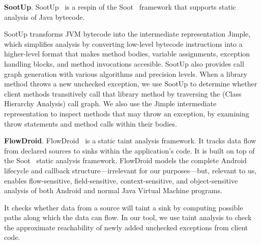 \textbf{SootUp}. SootUp~\cite{Karakaya24:_SootUp} is a respin of the Soot~\cite{vallee2010soot} framework that supports static analysis of Java bytecode.

SootUp transforms JVM bytecode into the intermediate representation Jimple, which simplifies analysis by converting low-level bytecode instructions into a higher-level format that makes method bodies, variable assignments, exception handling blocks, and method invocations accesible. SootUp also provides call graph generation with various algorithms and precision levels. When a library method throws a new unchecked exception, we use SootUp to determine whether client methods transitively call that library method by traversing the (Class Hierarchy Analysis) call graph. We also use the Jimple intermediate representation to inspect methods that may throw an exception, by examining throw statements and method calls within their bodies.

\textbf{FlowDroid}. FlowDroid~\cite{Arzt14:_flowdroid} is a static taint analysis framework. It tracks data flow from declared sources to sinks within the application's code. It is built on top of the Soot~\cite{vallee2010soot} static analysis framework. FlowDroid models the complete Android lifecycle and callback structure---irrelevant for our purposes---but, relevant to us, enables flow-sensitive, field-sensitive, context-sensitive, and object-sensitive analysis of both Android and normal Java Virtual Machine programs.

It checks whether data from a source will taint a sink by computing possible paths along which the data can flow. In our tool, we use taint analysis to check the approximate reachability of newly added unchecked exceptions from client code.

